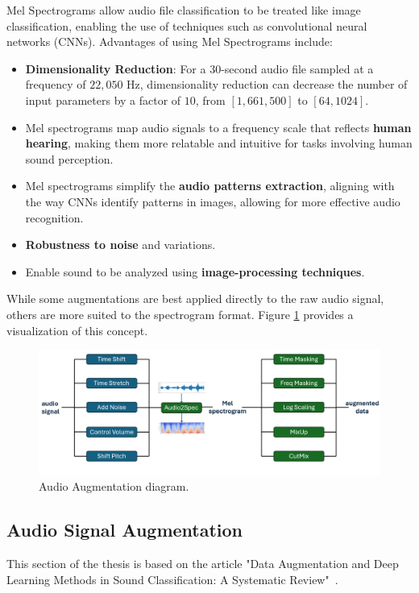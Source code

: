 Mel Spectrograms allow audio file classification to be treated like image classification, enabling the use of techniques such as convolutional neural networks (CNNs). Advantages of using Mel Spectrograms include:
\begin{itemize}
   \item \textbf{Dimensionality Reduction}: For a 30-second audio file sampled at a frequency of $22,050$ Hz, dimensionality reduction can decrease the number of input parameters by a factor of $10$, from $[1, 661, 500]$ to $[64, 1024]$.
   \item Mel spectrograms map audio signals to a frequency scale that reflects \textbf{human hearing}, making them more relatable and intuitive for tasks involving human sound perception.
   \item Mel spectrograms simplify the \textbf{audio patterns extraction}, aligning with the way CNNs identify patterns in images, allowing for more effective audio recognition.
   \item \textbf{Robustness to noise} and variations.
   \item Enable sound to be analyzed using \textbf{image-processing techniques}.
\end{itemize}

While some augmentations are best applied directly to the raw audio signal, others are more suited to the spectrogram format.  Figure \ref{fig:audioAugDiagram} provides a visualization of this concept.

\begin{figure}[!htb]
    \centering
    \includegraphics[scale=0.58]{Images/audio-augmentation.png}
    \caption{Audio Augmentation diagram.}
    \label{fig:audioAugDiagram}
\end{figure}

\subsection{Audio Signal Augmentation}

This section of the thesis is based on the article "Data Augmentation and Deep Learning Methods in Sound Classification: A Systematic Review"~\cite{AudioAugmentation}.

